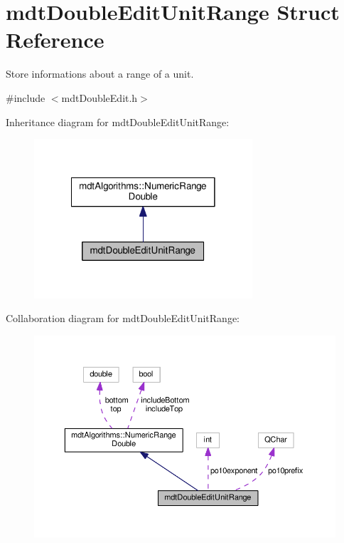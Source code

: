 \hypertarget{structmdt_double_edit_unit_range}{\section{mdt\-Double\-Edit\-Unit\-Range Struct Reference}
\label{structmdt_double_edit_unit_range}
}


Store informations about a range of a unit.  




{\ttfamily \#include $<$mdt\-Double\-Edit.\-h$>$}



Inheritance diagram for mdt\-Double\-Edit\-Unit\-Range\-:
\nopagebreak
\begin{figure}[H]
\begin{center}
\leavevmode
\includegraphics[width=230pt]{structmdt_double_edit_unit_range__inherit__graph}
\end{center}
\end{figure}


Collaboration diagram for mdt\-Double\-Edit\-Unit\-Range\-:
\nopagebreak
\begin{figure}[H]
\begin{center}
\leavevmode
\includegraphics[width=350pt]{structmdt_double_edit_unit_range__coll__graph}
\end{center}
\end{figure}
